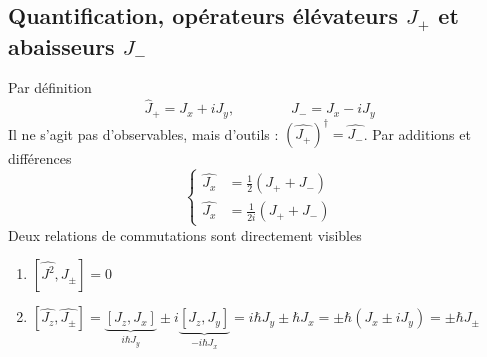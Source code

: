 	\subsection{Quantification, opérateurs élévateurs $J_+$ et abaisseurs $J_-$}
	Par définition
	\begin{equation}
	\hat{J}_+ = J_x + iJ_y,\qquad\qquad
	\hat{J}_- = J_x - iJ_y	
	\end{equation}
	Il ne s'agit pas d'observables, mais d'outils : $(\hat{J_+})^\dagger = \hat{J_-}$. Par additions 
	et différences
	\begin{equation}
	\left\{\begin{array}{ll}
	\hat{J_x} &= \frac{1}{2}\left(J_++J_-\right)\\
	\hat{J_x} &= \frac{1}{2i}\left(J_++J_-\right)	
	\end{array}\right.
	\end{equation}
	Deux relations de commutations sont directement visibles
	\begin{enumerate}
	\item $[\hat{J^2},J_\pm] = 0$
	\item $[\hat{J_z},\hat{J_\pm}] = \underbrace{[J_z,J_x]}_{i\hbar J_y}\pm i\underbrace{[J_z,J_y]}_{
	-i\hbar J_x} = i\hbar J_y\pm\hbar J_x = \pm \hbar(J_x\pm iJ_y) = \pm \hbar J_\pm$
	\end{enumerate}


